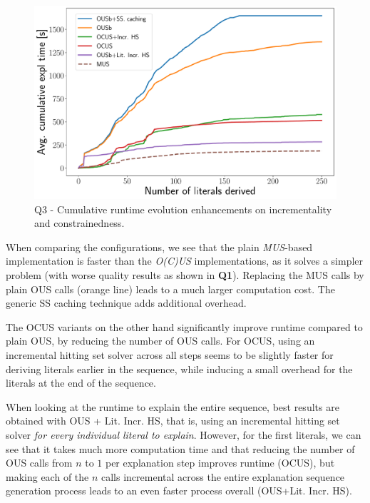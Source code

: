 \begin{figure}[t]
	\centering
	\includegraphics[width=0.85\columnwidth]{figures_post_paper/cumul_incr_avg_time_lits_derived_new.pdf}
	\caption{Q3 - Cumulative runtime evolution enhancements on incrementality and constrainedness.}
	\label{fig:incrementality_constraindness}
\end{figure}

When comparing the configurations, we see that the plain \emph{MUS}-based implementation is faster than the \emph{O(C)US} implementations, as it solves a simpler problem (with worse quality results as shown in \textbf{Q1}). %
Replacing the MUS calls by plain OUS calls (orange line) leads to a much larger computation cost. The generic SS caching technique adds additional overhead. 

The OCUS variants on the other hand significantly improve runtime compared to plain OUS, by reducing the number of OUS calls. For OCUS, using an incremental hitting set solver across all steps seems to be slightly faster for deriving literals earlier in the sequence, while inducing a small overhead for the literals at the end of the sequence.

When looking at the runtime to explain the entire sequence, best results are obtained with OUS + Lit. Incr. HS, that is, using an incremental hitting set solver \textit{for every individual literal to explain}. However, for the first literals, we can see that it takes much more computation time and that reducing the number of OUS calls from $n$ to $1$ per explanation step improves runtime (OCUS), but making each of the $n$ calls incremental across the entire explanation sequence generation process leads to an even faster process overall (OUS+Lit. Incr. HS).


